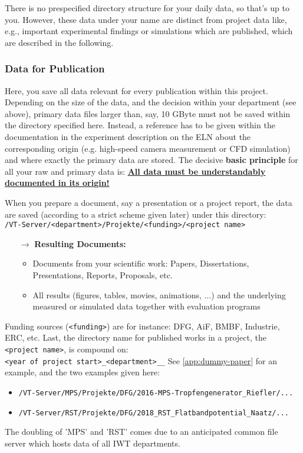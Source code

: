 \noindent There is no prespecified directory structure for your daily data, so
that’s up to you. However, these data under your name are distinct from project
data like, e.g., important experimental findings or simulations which are
published, which are described in the following.

\subsubsection{Data for Publication}\label{ssc:data-for-publication}

Here, you save all data relevant for every publication within this project.
Depending on the size of the data, and the decision within your department (see
above), primary data files larger than, say, 10 GByte must not be saved within
the directory specified here. Instead, a reference has to be given within the
documentation in the experiment description on the ELN about the corresponding
origin (e.g. high-speed camera measurement or CFD simulation) and where exactly
the primary data are stored. The decisive \textbf{basic principle} for all your
raw and primary data is:
\textbf{\underline{All data must be understandably documented in its origin!}}

When you prepare a document, say a presentation or a project report, the data
are saved (according to a strict scheme given later) under this directory: \\
\texttt{/VT-Server/<department>/Projekte/<funding>/<project name>}
\begin{itemize}
  \item[$\rightarrow$] \textbf{Resulting Documents:}
    \begin{itemize}
      \item Documents from your scientific work: Papers, Dissertations,
            Presentations, Reports, Proposals, etc.
      \item All results (figures, tables, movies, animations, ...) and the
            underlying measured or simulated data together with evaluation
            programs
    \end{itemize}
\end{itemize}
Funding sources (\texttt{<funding>}) are for instance: DFG, AiF, BMBF,
Industrie, ERC, etc. Last, the directory name for published works in a project,
the \texttt{<project name>}, is compound on: \\
\texttt{<year of project start>\_<department>\_<project handle>\_<family name>}
See \autoref{app:dummy-paper} for an example, and the two examples given here:
\begin{itemize}
  \item \texttt{/VT-Server/MPS/Projekte/DFG/2016-MPS-Tropfengenerator\_Riefler/...}
  \item \texttt{/VT-Server/RST/Projekte/DFG/2018\_RST\_Flatbandpotential\_Naatz/...}
\end{itemize}
The doubling of 'MPS' and 'RST' comes due to an anticipated common file server
which hosts data of all IWT departments.

